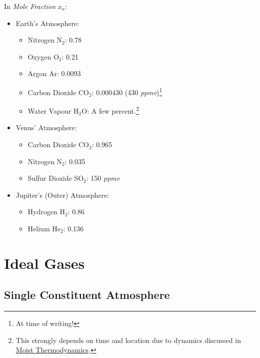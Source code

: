 In \textit{Mole Fraction} $x_a$:
\begin{multicols}{2}
\begin{itemize}
    \item Earth's Atmosphere: 
    \begin{itemize}
        \item Nitrogen N$_2$: 0.78
        \item Oxygen O$_2$: 0.21
        \item Argon Ar: 0.0093
        \item Carbon Dioxide CO$_2$: 0.000430 (430 \textit{ppmv})\footnote{At time of writing!}
        \item Water Vapour H$_2$O: A few percent.\footnote{This strongly depends on time and location due to dynamics discussed in \hyperref[Moist Thermodynamics]{Moist Thermodynamics}.}
    \end{itemize}
    \item  Venus' Atmosphere:
    \begin{itemize}
        \item Carbon Dioxide CO$_2$: 0.965
        \item Nitrogen N$_2$: 0.035
        \item Sulfur Dioxide SO$_2$: 150 \textit{ppmv}
    \end{itemize}
    \item  Jupiter's (Outer) Atmosphere:
    \begin{itemize}
        \item Hydrogen H$_2$: 0.86
        \item Helium He$_2$: 0.136
    \end{itemize}
\end{itemize}
\end{multicols}

\section{Ideal Gases}

\subsection{Single Constituent Atmosphere}

